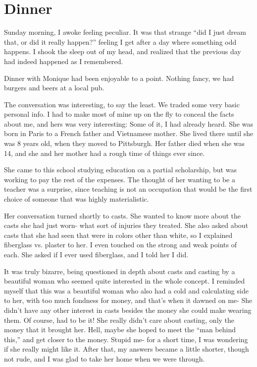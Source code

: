 \chapter{Dinner}
Sunday morning, I awoke feeling peculiar. It was that strange ``did I just dream that, or did
it really happen?'' feeling I get after a day where something odd happens. I shook the sleep out
of my head, and realized that the previous day had indeed happened as I remembered.

Dinner with Monique had been enjoyable to a point. Nothing fancy, we had burgers and beers
at a local pub.

The conversation was interesting, to say the least. We traded some very basic personal info.
I had to make most of mine up on the fly to conceal the facts about me, and hers was very
interesting: Some of it, I had already heard. She was born in Paris to a French father and
Vietnamese mother. She lived there until she was 8 years old, when they moved to Pittsburgh. Her
father died when she was 14, and she and her mother had a rough time of things ever since.

She came to this school studying education on a partial scholarship, but was working to pay
the rest of the expenses. The thought of her wanting to be a teacher was a surprise, since
teaching is not an occupation that would be the first choice of someone that was highly
materialistic.

Her conversation turned shortly to casts. She wanted to know more about the casts she had
just worn- what sort of injuries they treated. She also asked about casts that she had seen that
were in colors other than white, so I explained fiberglass vs. plaster to her. I even touched on
the strong and weak points of each. She asked if I ever used fiberglass, and I told her I did.

It was truly bizarre, being questioned in depth about casts and casting by a beautiful woman
who seemed quite interested in the whole concept. I reminded myself that this was a beautiful
woman who also had a cold and calculating side to her, with too much fondness for money, and
that's when it dawned on me- She didn't have any other interest in casts besides the money she
could make wearing them. Of course, had to be it! She really didn't care about casting, only the
money that it brought her. Hell, maybe she hoped to meet the ``man behind this,'' and get closer
to the money. Stupid me- for a short time, I was wondering if she really might like it. After
that, my answers became a little shorter, though not rude, and I was glad to take her home when
we were through.

